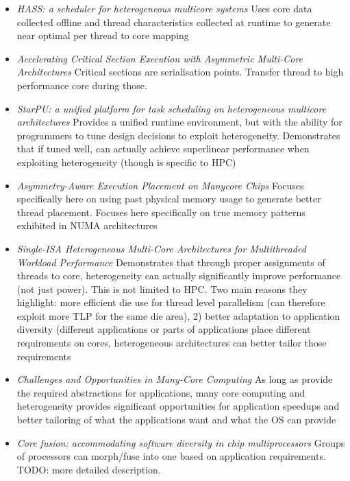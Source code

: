 \begin{itemize}
\item \emph{ HASS: a scheduler for heterogeneous multicore systems} Uses
core data collected offline and thread characteristics collected at runtime to 
generate near optimal per thread to core mapping \cite{Shelepov:2009:HSH:1531793.1531804}
\item \emph{Accelerating Critical Section Execution with Asymmetric Multi-Core Architectures}
Critical sections are serialisation points. Transfer thread to high performance 
core during those. \cite{Suleman:2009:ACS:1508244.1508274}
\item \emph{StarPU: a unified platform for task scheduling on heterogeneous
multicore architectures} Provides a unified runtime environment, but with the
ability for programmers to tune design decisions to exploit heterogeneity. Demonstrates
that if tuned well, can actually achieve superlinear performance when exploiting heterogeneity
(though is specific to HPC) \cite{CPE:CPE1631}
\item \emph{Asymmetry-Aware Execution Placement on Manycore Chips} Focuses
specifically here on using past physical memory usage to generate better thread
placement. Focuses here specifically on true memory patterns exhibited in 
NUMA architectures \cite{tumanovasymmetry}
\item \emph{Single-ISA Heterogeneous Multi-Core Architectures for Multithreaded Workload Performance}
Demonstrates that through proper assignments of threads to core, heterogeneity
can actually significantly improve performance (not just power). This is not
limited to HPC. Two main reasons they highlight: more efficient die use for thread
level parallelism (can therefore exploit more TLP for the same die area), 2)
better adaptation to application diversity (different applications or parts
of applications place
different requirements on cores, heterogeneous architectures can better
tailor those requirements \cite{Kumar:2004:SHM:998680.1006707}
\item \emph{Challenges and Opportunities
in Many-Core Computing} As long as provide the required abstractions for applications, 
many core computing and heterogeneity provides significant opportunities for application
speedups and better tailoring of what the applications want and what the OS can provide \cite{manferdelli2008challenges}
\item \emph{Core fusion: accommodating software diversity in chip multiprocessors}
Groups of processors can morph/fuse into one based on application requirements. 
TODO: more detailed description. \cite{Ipek:2007:CFA:1250662.1250686}

\end{itemize}
